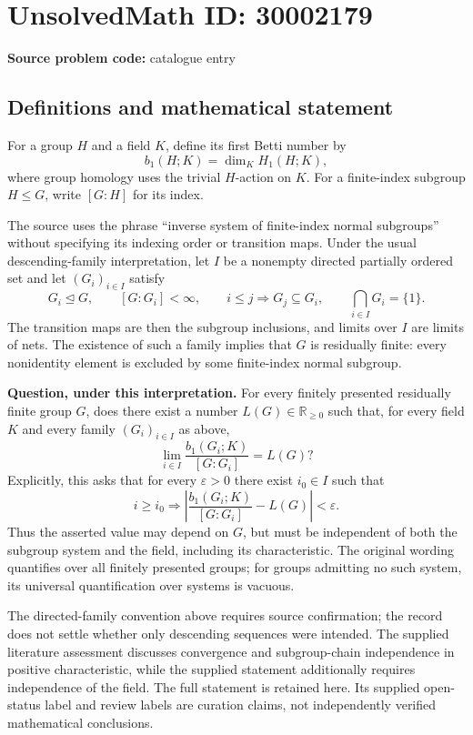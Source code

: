 \documentclass[11pt]{article}
\newcommand{\R}{\mathbb{R}}
\begin{document}
\section*{UnsolvedMath ID: 30002179}
\textbf{Source problem code:} catalogue entry
\subsection{Definitions and mathematical statement}
For a group \(H\) and a field \(K\), define its first Betti number by
\[
b_1(H;K)=\dim_K H_1(H;K),
\]
where group homology uses the trivial \(H\)-action on \(K\). For a finite-index subgroup \(H\leq G\), write \([G:H]\) for its index.

The source uses the phrase ``inverse system of finite-index normal subgroups'' without specifying its indexing order or transition maps. Under the usual descending-family interpretation, let \(I\) be a nonempty directed partially ordered set and let \((G_i)_{i\in I}\) satisfy
\[
G_i\trianglelefteq G,\qquad [G:G_i]<\infty,\qquad
 i\leq j\Longrightarrow G_j\subseteq G_i,\qquad
\bigcap_{i\in I}G_i=\{1\}.
\]
The transition maps are then the subgroup inclusions, and limits over \(I\) are limits of nets. The existence of such a family implies that \(G\) is residually finite: every nonidentity element is excluded by some finite-index normal subgroup.

\textbf{Question, under this interpretation.} For every finitely presented residually finite group \(G\), does there exist a number \(L(G)\in\R_{\geq 0}\) such that, for every field \(K\) and every family \((G_i)_{i\in I}\) as above,
\[
\lim_{i\in I}\frac{b_1(G_i;K)}{[G:G_i]}=L(G)?
\]
Explicitly, this asks that for every \(\varepsilon>0\) there exist \(i_0\in I\) such that
\[
i\geq i_0\Longrightarrow
\left|\frac{b_1(G_i;K)}{[G:G_i]}-L(G)\right|<\varepsilon.
\]
Thus the asserted value may depend on \(G\), but must be independent of both the subgroup system and the field, including its characteristic. The original wording quantifies over all finitely presented groups; for groups admitting no such system, its universal quantification over systems is vacuous.

The directed-family convention above requires source confirmation; the record does not settle whether only descending sequences were intended. The supplied literature assessment discusses convergence and subgroup-chain independence in positive characteristic, while the supplied statement additionally requires independence of the field. The full statement is retained here. Its supplied open-status label and review labels are curation claims, not independently verified mathematical conclusions.
\end{document}
